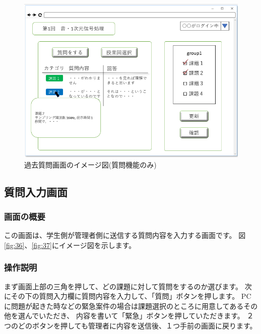 \begin{figure}[phtbp]
  \begin{center}
    \includegraphics[width=1\linewidth,clip]{./img/35.png}
    \caption{過去質問画面のイメージ図(質問機能のみ)}\label{fig:35}
  \end{center}
\end{figure}

\newpage



\subsection{質問入力画面}
\subsubsection{画面の概要}
この画面は、学生側が管理者側に送信する質問内容を入力する画面です。
図\ref{fig:36}、\ref{fig:37}にイメージ図を示します。

\subsubsection{操作説明}
まず画面上部の三角を押して、どの課題に対して質問をするのか選びます。
次にその下の質問入力欄に質問内容を入力して、「質問」ボタンを押します。
PCに問題が起きた時などの緊急案件の場合は課題選択のところに用意してあるその他を選んでいただき、
内容を書いて「緊急」ボタンを押していただきます。
２つのどのボタンを押しても管理者に内容を送信後、１つ手前の画面に戻ります。

